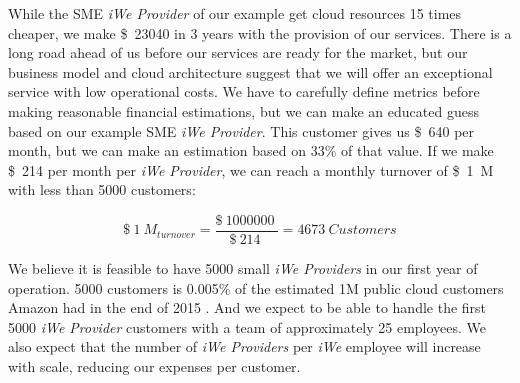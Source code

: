 
While the SME \textit{iWe Provider} of our example get cloud resources 15
times cheaper, we make \SI{23040}[\$]{} in 3 years with the provision of our
services.  There is a long road ahead of us before our services are ready for
the market, but our business model and cloud architecture suggest that we will
offer an exceptional service with low operational costs. We have to carefully
define metrics before making reasonable financial estimations, but we can make
an educated guess based on our example SME \textit{iWe Provider}.  This
customer gives us \SI{640}[\$]{} per month, but we can make an estimation based
on 33\% of that value. If we make \SI{214}[\$]{} per month per \textit{iWe
Provider}, we can reach a monthly turnover of \SI{1}[\$]{M} with less than 5000
customers:

\begin{equation}
    \SI{1}[\$]{M}_{turnover} = \frac{\SI{1000000}[\$]{}}{\SI{214}[\$]{}} = 4673~Customers
\end{equation}

We believe it is feasible to have 5000 small \textit{iWe Providers} in our
first year of operation. 5000 customers is 0.005\% of the estimated 1M public
cloud customers Amazon had in the end of 2015 \cite{howlongaws}. And we expect
to be able to handle the first 5000 \textit{iWe Provider} customers with a
team of approximately 25 employees. We also expect that the number of
\textit{iWe Providers} per \textit{iWe} employee will increase with scale,
reducing our expenses per customer.
